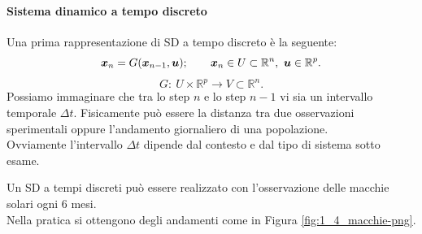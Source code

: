 \paragraph{Sistema dinamico a tempo discreto}%
\label{par:Sistema dinamico a tempo discreto}
Una prima rappresentazione di SD a tempo discreto
è la seguente:
\[
    \boldsymbol{x}_n = G(\boldsymbol{x}_{n-1}, \boldsymbol{u}); \qquad \boldsymbol{x}_n \in U \subset \mathbb{R}^n, \ \boldsymbol{u}  \in \mathbb{R}^p
.\] 
\[
    G: \ U\times \mathbb{R}^p \to V \subset \mathbb{R}^n
.\] 
Possiamo immaginare che tra lo step $n$ e lo step $n-1$ vi sia un intervallo temporale $\Delta t$. Fisicamente può essere la distanza tra due osservazioni sperimentali oppure l'andamento giornaliero di una popolazione. \\
Ovviamente l'intervallo $\Delta t$ dipende dal contesto e dal tipo di sistema sotto esame.
\begin{exmp}
    Un SD a tempi discreti può essere realizzato con l'osservazione delle macchie solari ogni 6 mesi. \\
    Nella pratica si ottengono degli andamenti come in Figura \ref{fig:1_4_macchie-png}.
\end{exmp}
